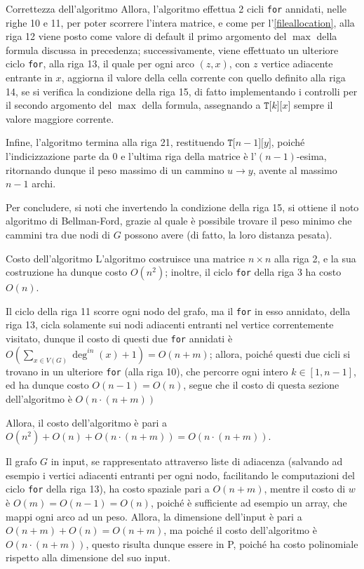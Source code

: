 \documentclass[a4paper, 12pt]{report}
\begin{document}
\begin{framedobs}{Correttezza dell'algoritmo}
        Allora, l'algoritmo effettua 2 cicli \texttt{for} annidati, nelle righe 10 e 11, per poter scorrere l'intera matrice, e come per l'\cref{fileallocation}, alla riga 12 viene posto come valore di default il primo argomento del $\max$ della formula discussa in precedenza; successivamente, viene effettuato un ulteriore ciclo \texttt{for}, alla riga 13, il quale per ogni arco $(z, x)$, con $z$ vertice adiacente entrante in $x$, aggiorna il valore della cella corrente con quello definito alla riga 14, se si verifica la condizione della riga 15, di fatto implementando i controlli per il secondo argomento del $\max$ della formula, assegnando a $\texttt{T[}k\texttt{][}x\texttt{]}$ sempre il valore maggiore corrente.

        Infine, l'algoritmo termina alla riga 21, restituendo $\texttt{T[}n - 1\texttt{][}y\texttt{]}$, poiché l'indicizzazione parte da $0$ e l'ultima riga della matrice è l'$(n - 1)$-esima, ritornando dunque il peso massimo di un cammino $u \rightarrow y$, avente al massimo $n - 1$ archi.

        Per concludere, si noti che invertendo la condizione della riga 15, si ottiene il noto algoritmo di Bellman-Ford, grazie al quale è possibile trovare il peso minimo che cammini tra due nodi di $G$ possono avere (di fatto, la loro distanza pesata).
    \end{framedobs}

    \begin{framedobs}{Costo dell'algoritmo}
        L'algoritmo costruisce una matrice $n \times n$ alla riga 2, e la sua costruzione ha dunque costo $O(n^2)$; inoltre, il ciclo \texttt{for} della riga 3 ha costo $O(n)$.

        Il ciclo della riga 11 scorre ogni nodo del grafo, ma il \texttt{for} in esso annidato, della riga 13, cicla solamente sui nodi adiacenti entranti nel vertice correntemente visitato, dunque il costo di questi due \texttt{for} annidati è $\displaystyle O\left(\sum_{x \in V(G)}{\deg^{in}(x) + 1} \right) = O(n + m)$; allora, poiché questi due cicli si trovano in un ulteriore \texttt{for} (alla riga 10), che percorre ogni intero $k \in [1, n- 1]$, ed ha dunque costo $O(n - 1) = O(n)$, segue che il costo di questa sezione dell'algoritmo è $O(n \cdot (n + m))$

        Allora, il costo dell'algoritmo è pari a $O(n ^2) + O(n) + O(n \cdot(n + m)) = O(n \cdot (n + m))$.

        Il grafo $G$ in input, se rappresentato attraverso liste di adiacenza (salvando ad esempio i vertici adiacenti entranti per ogni nodo, facilitando le computazioni del ciclo \texttt{for} della riga 13), ha costo spaziale pari a $O(n + m)$, mentre il costo di $w$ è $O(m) = O(n - 1) = O(n)$, poiché è sufficiente ad esempio un array, che mappi ogni arco ad un peso. Allora, la dimensione dell'input è pari a $O(n + m) + O(n) = O(n + m)$, ma poiché il costo dell'algoritmo è $O(n \cdot (n + m))$, questo risulta dunque essere in P, poiché ha costo polinomiale rispetto alla dimensione del suo input.
    \end{framedobs}
\end{document}
